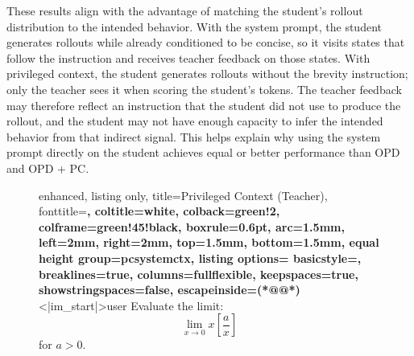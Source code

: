 These results align with the advantage of matching the student's rollout distribution to the intended behavior. With the system prompt, the student generates rollouts while already conditioned to be concise, so it visits states that follow the instruction and receives teacher feedback on those states. With privileged context, the student generates rollouts without the brevity instruction; only the teacher sees it when scoring the student's tokens. The teacher feedback may therefore reflect an instruction that the student did not use to produce the rollout, and the student may not have enough capacity to infer the intended behavior from that indirect signal. This helps explain why using the system prompt directly on the student achieves equal or better performance than OPD and OPD + PC.

\begin{figure}
    \centering
    \begin{minipage}[t]{0.48\textwidth}
\begin{tcblisting}{
    enhanced,
    listing only,
    title={Privileged Context (Teacher)},
    fonttitle=\bfseries,
    coltitle=white,
    colback=green!2,
    colframe=green!45!black,
    boxrule=0.6pt,
    arc=1.5mm,
    left=2mm,
    right=2mm,
    top=1.5mm,
    bottom=1.5mm,
    equal height group=pcsystemctx,
    listing options={
        basicstyle=\ttfamily\tiny,
        breaklines=true,
        columns=fullflexible,
        keepspaces=true,
        showstringspaces=false,
        escapeinside={(*@}{@*)}
    }
}
<|im_start|>user
Evaluate the limit: $$\lim_{x\to 0}x \left[ \frac{a}{x}\right]$$ for $a>0$.


\end{tcblisting}
\end{minipage}
\end{figure}

